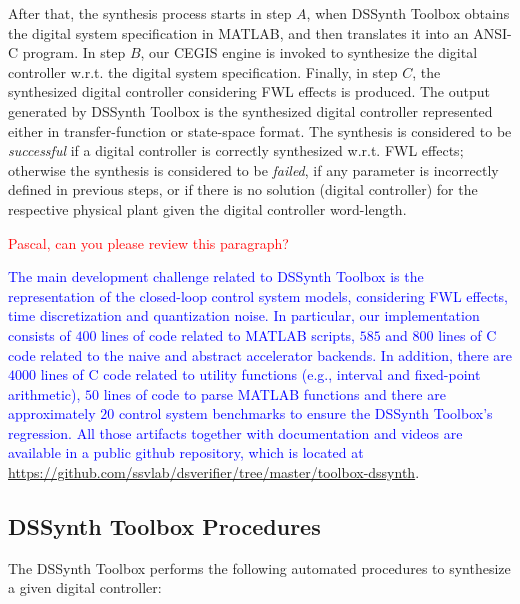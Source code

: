 \documentclass[10pt,conference]{IEEEtran}
\newcommand\tool{{DSSynth Toolbox}\xspace}
\begin{document}
After that, the synthesis process starts in step $A$, when \tool obtains the digital system 
specification in MATLAB, and then translates it into an ANSI-C program. 
In step $B$, our CEGIS engine is invoked to synthesize the digital controller w.r.t. the digital system
specification. Finally, in step $C$, the synthesized digital controller considering FWL effects is produced. 
The output generated by \tool is the synthesized digital controller represented either in transfer-function 
or state-space format. The synthesis is considered to be \emph{successful} if a digital controller is correctly 
synthesized w.r.t. FWL effects; otherwise the synthesis is considered to be \emph{failed}, if any parameter is 
incorrectly defined in previous steps, or if there is no solution (digital controller) for the respective physical plant
 given the digital controller word-length.

\textcolor{red}{Pascal, can you please review this paragraph?}

\textcolor{blue}{The main development challenge related to \tool is the representation of the
closed-loop control system models, considering FWL effects, time discretization 
and quantization noise.  In particular, our implementation consists of $400$
lines of code related to MATLAB scripts, $585$ and $800$ lines of C code related to the
naive and abstract accelerator backends. In addition, there are $4000$ lines of C code
related to utility functions (e.g., interval and fixed-point arithmetic), $50$ lines
of code to parse MATLAB functions and there are approximately $20$
control system benchmarks to ensure the \tool's regression.  All those artifacts together
with documentation and videos are available in a public github repository,
which is located at \url{https://github.com/ssvlab/dsverifier/tree/master/toolbox-dssynth}}.

\subsection{\tool Procedures}

The \tool performs the following automated procedures 
to synthesize a given digital controller:
\end{document}
